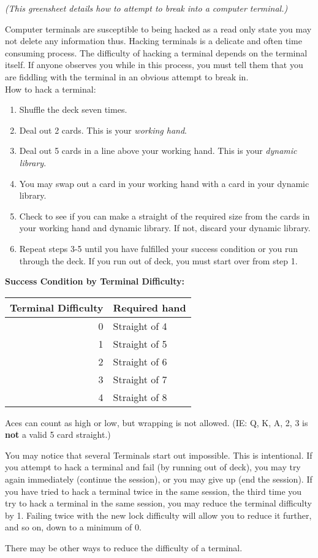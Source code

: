 \documentclass[green]{guildcamp4}
\begin{document}
\name{\gHacking{}}

\emph{(This greensheet details how to attempt to break into a computer terminal.)}

Computer terminals are susceptible to being hacked as a read only state you may not delete any information thus. Hacking terminals is a delicate and often time consuming process. The difficulty of hacking a terminal depends on the terminal itself. If anyone observes you while in this process, you must tell them that you are fiddling with the terminal in an obvious attempt to break in.\\

How to hack a terminal:
\begin{enumerate}
	\item Shuffle the deck seven times.
	\item Deal out 2 cards. This is your {\em working hand}.
	\item Deal out 5 cards in a line above your working hand. This is your {\em dynamic library}.
	\item You may swap out a card in your working hand with a card in your dynamic library.
	\item Check to see if you can make a straight of the required size from the cards in your working hand and dynamic library. If not, discard your dynamic library.
	\item Repeat steps 3-5 until you have fulfilled your success condition or you run through the deck.  If you run out of deck, you must start over from step 1.
\end{enumerate}

{\bf Success Condition by Terminal Difficulty:}\\

\begin{tabular}{||r|l||}
	\hline\hline
	Terminal Difficulty	& Required hand\\
	\hline
	0	& Straight of 4\\
	1	& Straight of 5\\
	2	& Straight of 6\\
	3	& Straight of 7\\
	4	& Straight of 8\\
	\hline\hline 
\end{tabular}

\vspace{10 mm}

Aces can count as high or low, but wrapping is not allowed. (IE: Q, K, A, 2, 3 is {\bf not} a valid 5 card straight.)

You may notice that several Terminals start out impossible. This is intentional. If you attempt to hack a terminal and fail (by running out of deck), you may try again immediately (continue the session), or you may give up (end the session). If you have tried to hack a terminal twice in the same session, the third time you try to hack a terminal in the same session, you may reduce the terminal difficulty by 1. Failing twice with the new lock difficulty will allow you to reduce it further, and so on, down to a minimum of 0.

There may be other ways to reduce the difficulty of a terminal.
\end{document}
